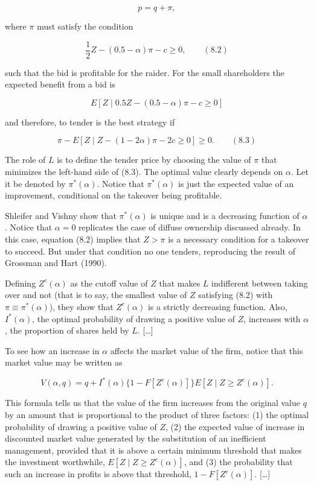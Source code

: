 \documentclass[11pt,a4paper]{article}
\begin{document}
\[p = q + \pi,\]

where \(\pi\) must satisfy the condition

\[\frac{1}{2}Z - (0.5 - \alpha)\pi - c \geq 0, \qquad (8.2)\]

such that the bid is profitable for the raider. For the small shareholders the expected benefit from
a bid is

\[E[Z \mid 0.5Z - (0.5-\alpha)\pi - c \geq 0]\]

and therefore, to tender is the best strategy if

\[\pi - E[Z \mid Z - (1-2\alpha)\pi - 2c \geq 0] \geq 0. \qquad (8.3)\]

The role of \(L\) is to define the tender price by choosing the value of \(\pi\) that minimizes the
left-hand side of (8.3). The optimal value clearly depends on \(\alpha\). Let it be denoted by
\(\pi^*(\alpha)\). Notice that \(\pi^*(\alpha)\) is just the expected value of an improvement,
conditional on the takeover being profitable.

Shleifer and Vishny show that \(\pi^*(\alpha)\) is unique and is a decreasing function of
\(\alpha\). Notice that \(\alpha = 0\) replicates the case of diffuse ownership discussed already.
In this case, equation (8.2) implies that \(Z > \pi\) is a necessary condition for a takeover to
succeed. But under that condition no one tenders, reproducing the result of Grossman and Hart
(1990).

Defining \(Z^c(\alpha)\) as the cutoff value of \(Z\) that makes \(L\) indifferent between taking
over and not (that is to say, the smallest value of \(Z\) satisfying (8.2) with
\(\pi \equiv \pi^*(\alpha)\)), they show that \(Z^c(\alpha)\) is a strictly decreasing function.
Also, \(I^*(\alpha)\), the optimal probability of drawing a positive value of \(Z\), increases with
\(\alpha\), the proportion of shares held by \(L\). {[}\ldots{]}

To see how an increase in \(\alpha\) affects the market value of the firm, notice that this market
value may be written as

\[V(\alpha, q) = q + I^*(\alpha)\{1 - F[Z^c(\alpha)]\}E[Z \mid Z \geq Z^c(\alpha)].\]

This formula tells us that the value of the firm increases from the original value \(q\) by an
amount that is proportional to the product of three factors: (1) the optimal probability of drawing
a positive value of \(Z\), (2) the expected value of increase in discounted market value generated
by the substitution of an inefficient management, provided that it is above a certain minimum
threshold that makes the investment worthwhile, \(E[Z \mid Z \geq Z^c(\alpha)]\), and (3) the
probability that such an increase in profits is above that threshold, \(1 - F[Z^c(\alpha)]\).
{[}\ldots{]}
\end{document}
